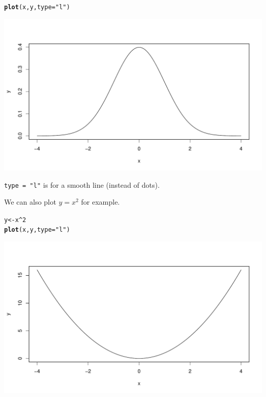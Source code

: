 \documentclass[oneside]{book}\usepackage[]{graphicx}\usepackage[dvipsnames,table,xcdraw]{xcolor}
\makeatletter
\def\maxwidth{ %
  \ifdim\Gin@nat@width>\linewidth
    \linewidth
  \else
    \Gin@nat@width
  \fi
}
\newcommand{\hlnum}[1]{\textcolor[rgb]{0.686,0.059,0.569}{#1}}%
\newcommand{\hlstr}[1]{\textcolor[rgb]{0.192,0.494,0.8}{#1}}%
\newcommand{\hlopt}[1]{\textcolor[rgb]{0,0,0}{#1}}%
\newcommand{\hlstd}[1]{\textcolor[rgb]{0.345,0.345,0.345}{#1}}%
\newcommand{\hlkwb}[1]{\textcolor[rgb]{0.69,0.353,0.396}{#1}}%
\newcommand{\hlkwc}[1]{\textcolor[rgb]{0.333,0.667,0.333}{#1}}%
\newcommand{\hlkwd}[1]{\textcolor[rgb]{0.737,0.353,0.396}{\textbf{#1}}}%
\newenvironment{kframe}{%
 \def\at@end@of@kframe{}%
 \ifinner\ifhmode%
  \def\at@end@of@kframe{\end{minipage}}%
  \begin{minipage}{\columnwidth}%
 \fi\fi%
 \def\FrameCommand##1{\hskip\@totalleftmargin \hskip-\fboxsep
 \colorbox{shadecolor}{##1}\hskip-\fboxsep
     \hskip-\linewidth \hskip-\@totalleftmargin \hskip\columnwidth}%
 \MakeFramed {\advance\hsize-\width
   \@totalleftmargin\z@ \linewidth\hsize
   \@setminipage}}%
 {\par\unskip\endMakeFramed%
 \at@end@of@kframe}
\newenvironment{knitrout}{}{} %
\newcommand{\code}[1]{\texttt{#1}}
\makeatother
\begin{document}
\begin{knitrout}
\color{fgcolor}\begin{kframe}
\begin{alltt}
\hlkwd{plot}\hlstd{(x, y,} \hlkwc{type} \hlstd{=} \hlstr{"l"}\hlstd{)}
\end{alltt}
\end{kframe}

{\centering \includegraphics[width=\maxwidth]{figure/unnamed-chunk-32-1} 

}


\end{knitrout}

\code{type = "l"} is for a smooth line (instead of dots).

We can also plot $y=x^2$ for example.
\begin{knitrout}
\color{fgcolor}\begin{kframe}
\begin{alltt}
\hlstd{y} \hlkwb{<-} \hlstd{x}\hlopt{^}\hlnum{2}
\hlkwd{plot}\hlstd{(x, y,} \hlkwc{type} \hlstd{=} \hlstr{"l"}\hlstd{)}
\end{alltt}
\end{kframe}

{\centering \includegraphics[width=\maxwidth]{figure/unnamed-chunk-33-1} 

}


\end{knitrout}
\end{document}

